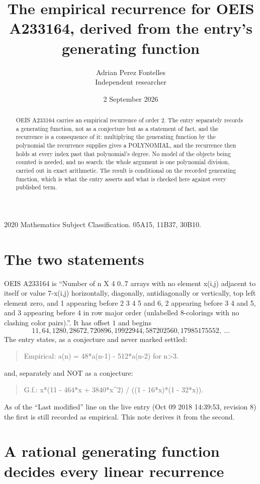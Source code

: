 \documentclass[11pt,a4paper]{article}
\title{The empirical recurrence for OEIS A233164, derived from the entry's generating function}
\author{Adrian Perez Fontelles\\ \small Independent researcher}
\date{2 September 2026}
\theoremstyle{plain}
\theoremstyle{definition}
\begin{document}
\maketitle

\begin{abstract}
OEIS A233164 carries an empirical recurrence of order $2$. The entry separately records a
generating function, not as a conjecture but as a statement of fact, and the recurrence is a
consequence of it: multiplying the generating function by the polynomial the recurrence
supplies gives a POLYNOMIAL, and the recurrence then holds at every index past that
polynomial's degree. No model of the objects being counted is needed, and no search: the
whole argument is one polynomial division, carried out in exact arithmetic. The result is
conditional on the recorded generating function, which is what the entry asserts and what is
checked here against every published term.
\end{abstract}

\noindent\small 2020 Mathematics Subject Classification. 05A15, 11B37, 30B10.\normalsize

\section{The two statements}

OEIS A233164 is ``Number of n X 4 0..7 arrays with no element x(i,j) adjacent to itself or value 7-x(i,j) horizontally, diagonally, antidiagonally or vertically, top left element zero, and 1 appearing before 2 3 4 5 and 6, 2 appearing before 3 4 and 5, and 3 appearing before 4 in row major order (unlabelled 8-colorings with no clashing color pairs).''. It has offset $1$ and begins
\[
11, 64, 1280, 28672, 720896, 19922944, 587202560, 17985175552,\ \dots
\]
The entry states, as a conjecture and never marked settled:
\begin{quote}
Empirical: a(n) = 48*a(n-1) - 512*a(n-2) for n>3.
\end{quote}
and, separately and NOT as a conjecture:
\begin{quote}
G.f.: x*(11 - 464*x + 3840*x\^{}2) / ((1 - 16*x)*(1 - 32*x)).
\end{quote}
As of the ``Last modified'' line on the live entry (Oct 09 2018 14:39:53, revision 8) the first is still
recorded as empirical. This note derives it from the second.

\section{A rational generating function decides every linear recurrence}
\end{document}
